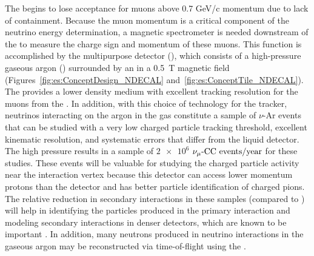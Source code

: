 The  begins to lose acceptance for muons above 0.7 GeV/c momentum due to lack of containment.  Because the muon momentum is a critical component of the neutrino energy determination, a magnetic spectrometer is needed downstream of the  to measure the charge sign and momentum of these muons.  This function is accomplished by the multipurpose detector (), which consists of a high-pressure gaseous argon  () surrounded by an  in a \SI{0.5}{T} magnetic field (Figures~\ref{fig:es:ConceptDesign_NDECAL} and~\ref{fig:es:ConceptTile_NDECAL}). 
The  provides a lower density medium with excellent tracking resolution for the muons from the .  In addition, with this choice of technology for the tracker, neutrinos interacting on the argon in the gas  constitute a sample of $\nu$-Ar events that can be studied with a very low charged particle tracking threshold, excellent kinematic resolution, and systematic errors that differ from the liquid detector. The high pressure results in a sample of $\num{2e6}$ ${\nu_\mu \text{-CC events/year}}$ for these studies. These events will be valuable for studying the charged particle activity near the interaction vertex because this detector can access lower momentum protons than the  detector and has better particle identification of charged pions.  The relative reduction in secondary interactions in these samples (compared to ) will help in identifying the particles produced in the primary interaction and modeling secondary interactions in denser detectors, which are known to be important \cite{Friedland:2018vry}.
In addition, many neutrons produced in neutrino interactions in the gaseous argon may be reconstructed via time-of-flight using the .    
  

